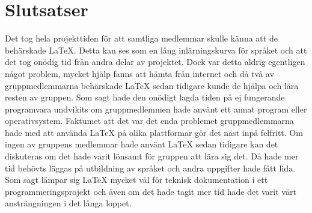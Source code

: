 \section{Slutsatser}
Det tog hela projekttiden för att samtliga medlemmar skulle känna att de behärskade {\LaTeX}. Detta kan ses som en lång inlärningskurva för språket och att det tog onödig tid från andra delar av projektet. Dock var detta aldrig egentligen något problem, mycket hjälp fanns att hämta från internet och då två av gruppmedlemmarna behärskade {\LaTeX} sedan tidigare kunde de hjälpa och lära resten av gruppen. 
\newline
\newline
Som sagt hade den onödigt lagda tiden på ej fungerande programvara undvikits om gruppmedlemmen hade använt ett annat program eller operativsystem. Faktumet att det var det enda problemet gruppmedlemmarna hade med att använda {\LaTeX} på olika plattformar gör det näst inpå felfritt.  
\newline
\newline
Om ingen av gruppens medlemmar hade använt {\LaTeX} sedan tidigare kan det diskuteras om det hade varit lönsamt för gruppen att lära sig det. Då hade mer tid behövts läggas på utbildning av språket och andra uppgifter hade fått lida. Som sagt lämpar sig {\LaTeX} mycket väl för teknisk dokumentation i ett programmeringsprojekt och även om det hade tagit mer tid hade det varit värt ansträngningen i det långa loppet.